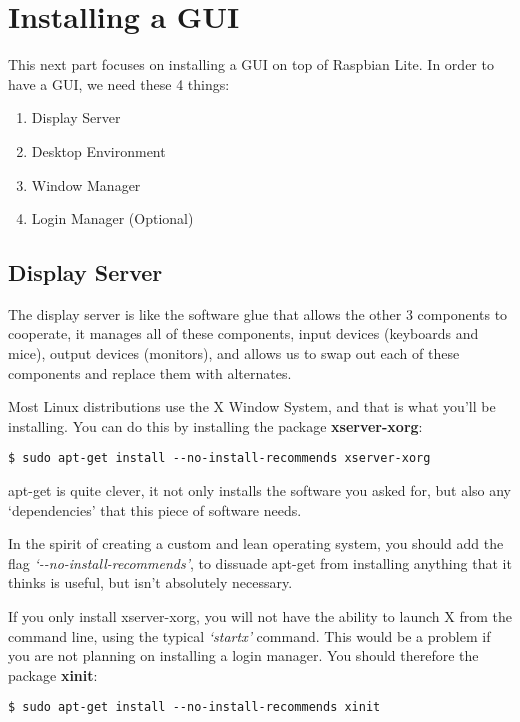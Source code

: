 \section{Installing a GUI}

	This next part focuses on installing a GUI on top of Raspbian Lite. In order to have a GUI, we need these 4 things:
	
	\begin{enumerate}[nosep]
		\item Display Server
		\item Desktop Environment
		\item Window Manager
		\item Login Manager (Optional)
	\end{enumerate}
		
	\subsection{Display Server}
	
		The display server is like the software glue that allows the other 3 components to cooperate, it manages all of these components, input devices (keyboards and mice), output devices (monitors), and allows us to swap out each of these components and replace them with alternates.
		
		Most Linux distributions use the X Window System, and that is what you'll be installing. You can do this by installing the package \textbf{xserver-xorg}:
	
\begin{lstlisting}[breaklines=true]
$ sudo apt-get install --no-install-recommends xserver-xorg
\end{lstlisting}

		apt-get is quite clever, it not only installs the software you asked for, but also any `dependencies' that this piece of software needs.
		
		In the spirit of creating a custom and lean operating system, you should add the flag \textit{\mbox{`-\--no-install-recommends'}}, to dissuade apt-get from installing anything that it thinks is useful, but isn't absolutely necessary.
		
		If you only install xserver-xorg, you will not have the ability to launch X from the command line, using the typical \textit{`startx'} command. This would be a problem if you are not planning on installing a login manager. You should therefore the package \textbf{xinit}:
	
\begin{lstlisting}[breaklines=true]
$ sudo apt-get install --no-install-recommends xinit
\end{lstlisting}

